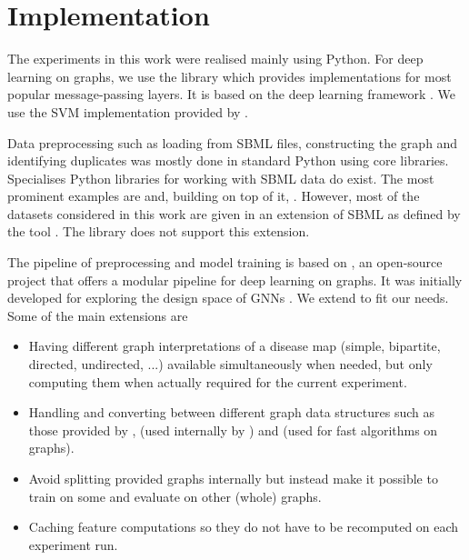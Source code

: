 \documentclass[
	fontsize=10pt, %
	twoside=false, %
	secnumdepth=1, %
  toc=indentunnumbered %
]{kaobook}
\begin{document}
\section{Implementation}

The experiments in this work were realised mainly using Python. For deep
learning on graphs, we use the library 
\cite{fey_FastGraphRepresentation_2019} which provides implementations for most
popular message-passing layers. It is based on the deep learning framework
 \cite{paszke_PyTorchImperativeStyle_2019}. We use the SVM
implementation provided by 
\cite{pedregosa_ScikitlearnMachineLearning_}.

Data preprocessing such as loading from SBML files, constructing the graph and
identifying duplicates was mostly done in standard Python using core libraries.
Specialises Python libraries for working with SBML data do exist. The most
prominent examples are 
\cite{bornstein_LibSBMLAPILibrary_2008} and, building on top of it,
 \cite{ebrahim_COBRApyCOnstraintsBasedReconstruction_2013}.
However, most of the datasets considered in this work are given in an extension
of SBML as defined by the tool . The 
library does not support this extension.

The pipeline of preprocessing and model training is based on 
\cite{noauthor_snap-stanfordgraphgym_2021}, an open-source project that offers a
modular pipeline for deep learning on graphs. It was initially developed for
exploring the design space of GNNs \cite{you_design_2020}. We extend
 to fit our needs. Some of the main extensions are
\begin{itemize}
\item Having different graph interpretations of a disease map (simple,
  bipartite, directed, undirected, ...) available simultaneously when needed,
  but only computing them when actually required for the current experiment.
\item Handling and converting between different graph data structures such as
  those provided by ,  (used internally by
  ) and  (used for fast algorithms on graphs).
\item Avoid splitting provided graphs internally but instead make it possible to
  train on some and evaluate on other (whole) graphs.
\item Caching feature computations so they do not have to be recomputed on each
  experiment run.
\end{itemize}
\end{document}
